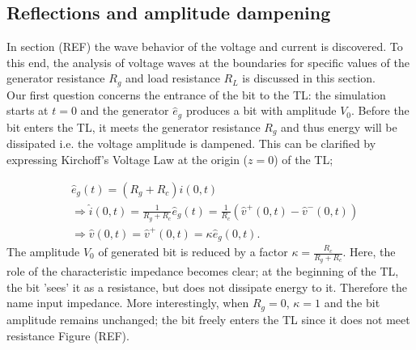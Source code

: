\subsection{Reflections and amplitude dampening}
In section (REF) the wave behavior of the voltage and current is discovered. To this end, the analysis of voltage waves at the boundaries for specific values of the generator resistance $R_g$ and load resistance $R_L$ is discussed in this section. \\

Our first question concerns the entrance of the bit to the TL: the simulation starts at $t=0$ and the generator $\hat{e}_g$ produces a bit with amplitude $V_0$. Before the bit enters the TL, it meets the generator resistance $R_g$ and thus energy will be dissipated i.e. the voltage amplitude is dampened. This can be clarified by expressing Kirchoff's Voltage Law at the origin ($z=0$) of the TL;

\begin{align}
&\hat{e}_g(t) = (R_g + R_c)\hat{i}(0, t) \\
&\Rightarrow \hat{i}(0, t) = \frac{1}{R_g+R_c}\hat{e}_g(t)= \frac{1}{R_c}(\hat{v}^{+}(0, t) - \hat{v}^{-}(0, t)) \\
&\Rightarrow \hat{v}(0, t) = \hat{v}^{+}(0, t) =\kappa\hat{e}_g(0, t).
\end{align}
The amplitude $V_0$ of generated bit is reduced by a factor $\kappa = \frac{R_c}{R_g + R_c}$. Here, the role of the characteristic impedance becomes clear; at the beginning of the TL, the bit 'sees' it as a resistance, but does not dissipate energy to it. Therefore the name input impedance. More interestingly, when $R_g = 0$, $\kappa = 1$ and the bit amplitude remains unchanged; the bit freely enters the TL since it does not meet resistance Figure (REF).














